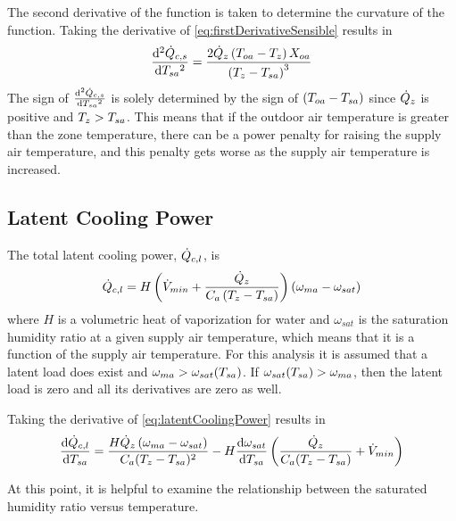 The second derivative of the function is taken to determine the
curvature of the function. Taking the derivative of 
\ref{eq:firstDerivativeSensible} results in
\begin{equation}
    \dv[2]{\dot{Q}_{c,s}}{T_{sa}{}} = \frac{2 \dot{Q}_{z}
    \left(T_{oa}-T_z\right) X_{oa} }{\left(T_z-T_{sa}{}\right)^3}
\end{equation}
The sign of \(\dv[2]{\dot{Q}_{c,s}}{T_{sa}{}}\) is solely determined by
the sign of \((T_{oa}{}-T_{sa}{})\) since \(\dot{Q}_{z}\) is positive
and \(T_z > T_{sa}{} \). This means that if the outdoor air temperature is
greater than the zone temperature, there can be a power penalty for
raising the supply air temperature, and this penalty gets worse as the
supply air temperature is increased.  


\subsection{Latent Cooling Power}

The total latent cooling power, \(\dot{Q}_{c,l}\), is 
\begin{equation}\label{eq:latentCoolingPower}
   \dot{Q}_{c,l} = H \left(\dot{V}_{min} + \frac{\dot{Q}_{z}}{C_{a}\left(T_{z}-T_{sa}{}\right)} \right) \left( \omega_{ma} -
   \omega_{sat} \right) 
\end{equation}
where \(H\) is a volumetric heat of vaporization for water and \(\omega_{sat}\)
is the saturation humidity ratio at a given supply air temperature, which means
that it is a function of the supply air temperature.  For this analysis it is
assumed that a latent load does exist and \(\omega_{ma} >
\omega_{sat}(T_{sa}{})\). If \(\omega_{sat}(T_{sa}{}) > \omega_{ma}\), then
the latent load is zero and all its derivatives are zero as well.

Taking the derivative of  \ref{eq:latentCoolingPower} results in
\begin{equation}\label{eq:firstDerivativeLatentPower}
    \dv{\dot{Q}_{c,l}}{T_{sa}{}} = \frac{H \dot{Q}_{z} \left(\omega_{ma} -\omega_{sat} \right)}{C_{a} (T_{z}-T_{sa}{})^2} 
    -H \dv{\omega_{sat}}{T_{sa}{}} \left(\frac{\dot{Q}_{z}}{C_{a} (T_{z}-T_{sa}{})}+\dot{V}_{min}\right) 
\end{equation}

At this point, it is helpful to examine the relationship between the
saturated humidity ratio versus temperature. 

